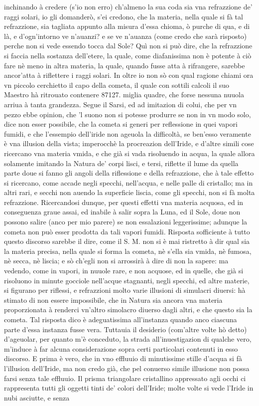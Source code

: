 \documentclass[11pt,twoside,openany]{book}
\begin{document}
inchinando à credere (s'io non erro) ch'almeno la sua coda sia vna refrazzione de' raggi solari, io gli domanderò, s'ei credono, che la materia, nella quale si fà tal refrazzione, sia tagliata appunto alla misura d'essa chioma, ò purche di qua, e di là, e d'ogn'intorno ve n'auanzi? e se ve n'auanza (come credo che sarà risposto) perche non si vede essendo tocca dal Sole? Quì non si può dire, che la refrazzione si faccia nella sostanza dell'etere, la quale, come diafanissima non è potente à ciò fare nè meno in altra materia, la quale, quando fusse atta à rifrangere, sarebbe ancor'atta à riflettere i raggi solari. In oltre io non sò con qual ragione chiami ora vn piccolo cerchietto il capo della cometa, il quale con sottili calcoli il suo Maestro hà ritrouato contenere 87127. miglia quadre, che forse nessuna nuuola arriua à tanta grandezza. Segue il Sarsi, ed ad imitazion di colui, che per vn pezzo ebbe opinion, che 'l suono non si potesse produrre se non in vn modo solo, dice non esser possibile, che la cometa si generi per reflessione in quei vapori fumidi, e che l'essempio dell'iride non ageuola la difficoltà, se ben'esso veramente è vna illusion della vista; imperocchè la procreazion dell'Iride, e d'altre simili cose ricercano vna materia vmida, e che già si vada risoluendo in acqua, la quale allora solamente imitando la Natura de' corpi lisci, e tersi, riflette il lume da quella parte doue si fanno gli angoli della riflessione e della refrazzione, che à tale effetto si ricercano, come accade negli specchi, nell'acqua, e nelle palle di cristallo; ma in altri rari, e secchi non auendo la superficie liscia, come gli specchi, non si fà molta refrazzione. Ricercandosi dunque, per questi effetti vna materia acquosa, ed in conseguenza graue assai, ed inabile à salir sopra la Luna, ed il Sole, doue non possono salire (anco per mio parere) se non essalazioni leggerissime; adunque la cometa non può esser prodotta da tali vapori fumidi. Risposta sofficiente à tutto questo discorso sarebbe il dire, come il S. M. non si è mai ristretto à dir qual sia la materia precisa, nella quale si forma la cometa, nè s'ella sia vmida, nè fumosa, nè secca, nè liscia; e sò ch'egli non si arrossirà à dire di non la sapere: ma vedendo, come in vapori, in nuuole rare, e non acquose, ed in quelle, che già si risoluono in minute gocciole nell'acque stagnanti, negli specchi, ed altre materie, si figurano per riflessi, e refrazzioni molto varie illusioni di simulacri diuersi: hà stimato di non essere impossibile, che in Natura sia ancora vna materia proporzionata à renderci vn'altro simolacro diuerso dagli altri, e che questo sia la cometa. Tal risposta dico è adeguatissima all'instanza quando anco ciascuna parte d'essa instanza fusse vera. Tuttauia il desiderio (com'altre volte hò detto) d'ageuolar, per quanto m'è conceduto, la strada all'inuestigazion di qualche vero, m'induce à far alcuna considerazione sopra certi particolari contenuti in esso discorso. E prima è vero, che in vno effluuio di minutissime stille d'acqua si fà l'illusion dell'Iride, ma non credo già, che pel conuerso simile illusione non possa farsi senza tale effluuio. Il prisma triangolare cristallino appressato agli occhi ci rappresenta tutti gli oggetti tinti de' colori dell'Iride; molte volte si vede l'Iride in nubi asciutte, e senza 
\end{document}
